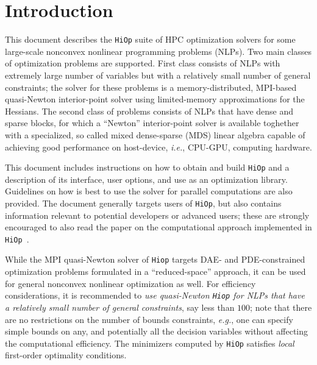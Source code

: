 \documentclass[11pt]{article}
\newcounter{line}
\newcommand{\Hi}{\texttt{HiOp}\xspace}
\begin{document}
\tableofcontents

\newpage

\section{Introduction}

This document describes the \Hi suite of HPC optimization solvers for some large-scale nonconvex nonlinear programming problems (NLPs). Two main classes of optimization problems are supported. First class consists of NLPs with extremely large number of variables  but with a relatively small number of general constraints; the solver for these problems is a  memory-distributed, MPI-based quasi-Newton interior-point solver using limited-memory approximations for the Hessians. The second class of problems consists of NLPs that have dense and sparse blocks, for which a ``Newton'' interior-point solver is available toghether with a specialized, so called mixed dense-sparse (MDS) linear algebra capable of achieving good performance on host-device, \textit{i.e.}, CPU-GPU, computing hardware. 

This document includes instructions on how to obtain and
build \Hi and a description of its interface, user options, and use as an optimization library. Guidelines on how is best to use the solver for parallel computations are also provided. The document generally targets users of \Hi, but also contains information relevant to potential developers or advanced users; these are strongly encouraged to also read the paper on the computational approach implemented in \Hi~\cite{petra_hiop}.


While the MPI quasi-Newton solver of \texttt{Hiop} targets DAE- and PDE-constrained optimization problems formulated in a ``reduced-space'' approach, it can be used for general nonconvex nonlinear optimization as well. For efficiency considerations, it is recommended to \textit{use quasi-Newton \texttt{Hiop} for NLPs that have a relatively small number of general constraints}, say less than $100$; note that there are no restrictions on the number of bounds constraints, \textit{e.g.}, one can specify simple bounds on any, and potentially all the decision variables without affecting the computational efficiency. The minimizers computed by \Hi satisfies \textit{local} first-order optimality conditions.
\end{document}
